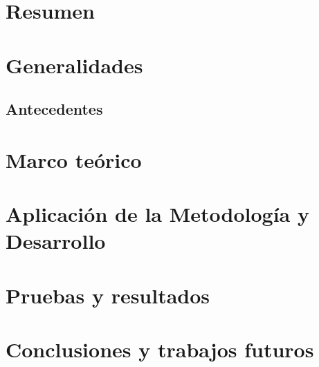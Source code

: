 \documentclass[11pt, a4paper, oneside]{book}
\begin{document}
\pagestyle{empty} %
\titleGP

\tableofcontents


\chapter{Resumen}
\chapter{Generalidades}
\section{Antecedentes}
\chapter{Marco teórico}
\chapter{Aplicación de la Metodología y Desarrollo}
\chapter{Pruebas y resultados}
\chapter{Conclusiones y trabajos futuros}
\end{document}
